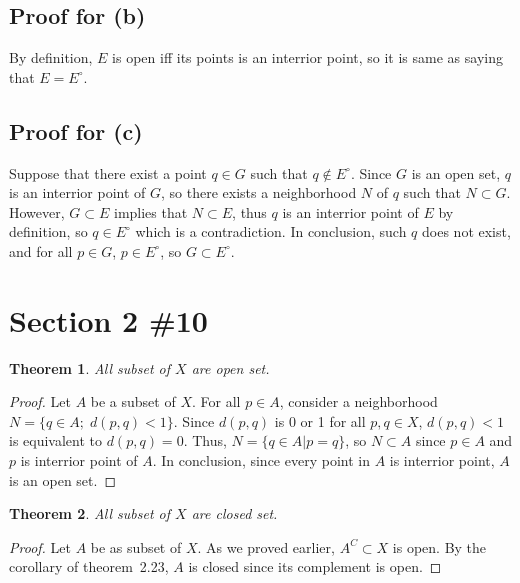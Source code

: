 \documentclass{scrartcl}
\newtheorem{theorem}{Theorem}
\begin{document}
\subsection{Proof for (b)}
By definition, \(E\) is open iff its points is an interrior point, so it is same as saying that \(E = E^\circ\).

\subsection{Proof for (c)}
Suppose that there exist a point \(q \in G\) such that \(q \not \in E^\circ\).
Since \(G\) is an open set, \(q\) is an interrior point of \(G\), so there exists a neighborhood \(N\) of \(q\) such that \(N \subset G\).
However, \(G \subset E\) implies that \(N \subset E\), thus \(q\) is an interrior point of \(E\) by definition, so \(q \in E^\circ\) which is a contradiction.
In conclusion, such \(q\) does not exist, and for all \(p \in G\), \(p \in E^\circ\), so \(G \subset E^\circ\).

\section{Section 2 \#10}
\begin{theorem}
  All subset of \(X\) are open set.
\end{theorem}
\begin{proof}
  Let \(A\) be a subset of \(X\).
  For all \(p \in A\), consider a neighborhood \(N = \{q \in A;\; d(p, q) < 1\}\).
  Since \(d(p, q)\) is 0 or 1 for all \(p, q \in X\), \(d(p, q) < 1\) is equivalent to \(d(p, q) = 0\).
  Thus, \(N = \{q \in A | p = q\}\), so \(N \subset A\) since \(p \in A\) and \(p\) is interrior point of \(A\).
  In conclusion, since every point in \(A\) is interrior point, \(A\) is an open set.
\end{proof}

\begin{theorem}
  All subset of \(X\) are closed set.
\end{theorem}
\begin{proof}
  Let \(A\) be as subset of \(X\).
  As we proved earlier, \(A^C \subset X\) is open.
  By the corollary of theorem~2.23, \(A\) is closed since its complement is open.
\end{proof}
\end{document}
